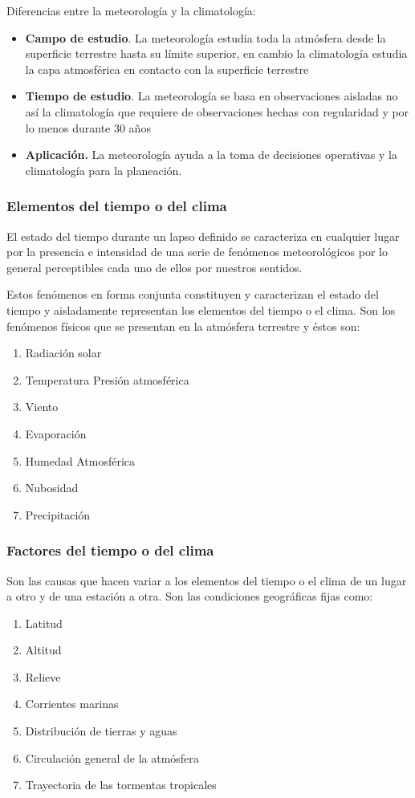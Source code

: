 Diferencias entre la meteorología y la climatología:

\begin{itemize}
    \item \textbf{Campo de estudio}. La meteorología estudia toda la atmósfera desde la superficie terrestre hasta su límite superior, en cambio la climatología estudia la capa atmosférica en contacto con la superficie terrestre
    \item \textbf{Tiempo de estudio}. La meteorología se basa en observaciones aisladas no así la climatología que requiere de observaciones hechas con regularidad y por lo menos durante 30 años
    \item \textbf{Aplicación.} La meteorología ayuda a la toma de decisiones operativas y la climatología para la planeación. 
\end{itemize}

\subsubsection{Elementos del tiempo o del clima}

El estado del tiempo durante un lapso definido se caracteriza en cualquier lugar por la presencia e intensidad de una serie de fenómenos meteorológicos por lo general perceptibles cada uno de ellos por nuestros sentidos.

Estos fenómenos en forma conjunta constituyen y caracterizan el estado del tiempo y aisladamente representan los elementos del tiempo o el clima.
Son los fenómenos físicos que se presentan en la atmósfera terrestre y éstos son:
\begin{enumerate}
    \item Radiación solar
    \item Temperatura Presión atmosférica
    \item Viento
    \item Evaporación
    \item Humedad Atmosférica
    \item Nubosidad
    \item Precipitación
\end{enumerate}

\subsubsection{Factores del tiempo o del clima}
Son las causas que hacen variar a los elementos del tiempo o el clima de un lugar a otro y de una estación a otra. Son las condiciones geográficas fijas como:
\begin{enumerate}
    \item Latitud
    \item Altitud
    \item Relieve
    \item Corrientes marinas
    \item Distribución de tierras y aguas
    \item Circulación general de la atmósfera
    \item Trayectoria de las tormentas tropicales
\end{enumerate}

